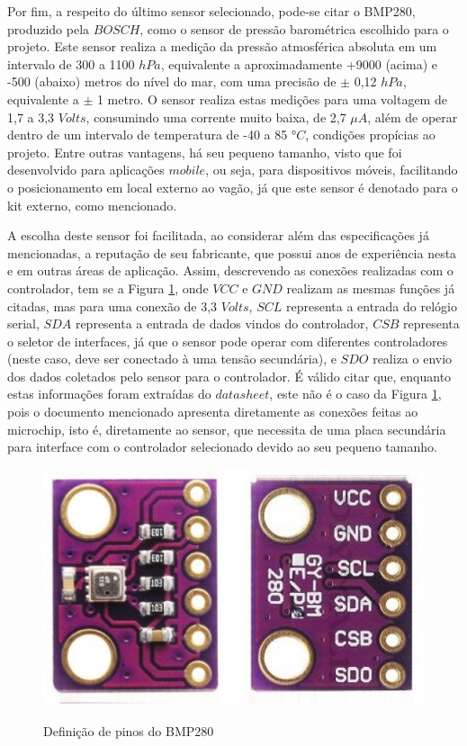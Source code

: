 \documentclass[acronym,symbols]{fei}
\begin{document}
Por fim, a respeito do último sensor selecionado, pode-se citar o BMP280, produzido pela $BOSCH$, 
como o sensor de pressão barométrica escolhido para o projeto. Este sensor realiza a medição da pressão atmosférica absoluta em um intervalo de 300 a 1100 $hPa$, equivalente a aproximadamente +9000 (acima) e -500 (abaixo) metros do nível do mar, com uma precisão de $\pm$ 0,12 $hPa$, equivalente a $\pm$ 1 metro. O sensor realiza estas medições para uma voltagem de 1,7 a 3,3 $Volts$, consumindo uma corrente muito baixa, de 2,7 $\mu$$A$, além de operar dentro de um intervalo de temperatura de -40 a 85 $°C$, condições propícias ao projeto. Entre outras vantagens, há seu pequeno tamanho, visto que foi desenvolvido para aplicações $mobile$, ou seja, para dispositivos móveis, facilitando o posicionamento em local externo ao vagão, já que este sensor é denotado para o kit externo, como mencionado.

A escolha deste sensor foi facilitada, ao considerar além das especificações já mencionadas, a reputação de seu fabricante, que possui anos de experiência nesta e em outras áreas de aplicação. Assim, descrevendo as conexões realizadas com o controlador, tem se a Figura \ref{fig:PinPress}, onde $VCC$ e $GND$ realizam as mesmas funções já citadas, mas para uma conexão de 3,3 $Volts$, $SCL$ representa a entrada do relógio serial, $SDA$ representa a entrada de dados vindos do controlador, $CSB$ representa o seletor de interfaces, já que o sensor pode operar com diferentes controladores (neste caso, deve ser conectado à uma tensão secundária), e $SDO$ realiza o envio dos dados coletados pelo sensor para o controlador. É válido citar que, enquanto estas informações foram extraídas do $datasheet$, este não é o caso da Figura \ref{fig:PinPress}, pois o documento mencionado apresenta diretamente as conexões feitas ao microchip, isto é, diretamente ao sensor, que necessita de uma placa secundária para interface com o controlador selecionado devido ao seu pequeno tamanho.

\begin{figure}[!htb]
\centering
    \caption{Definição de pinos do BMP280}
    \includegraphics[width=0.8\linewidth]{Imagens/PinPress.png}
    \label{fig:PinPress}
\end{figure}
\end{document}

